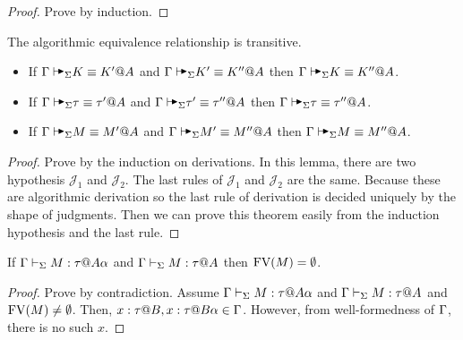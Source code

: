 \begin{proof}
    Prove by induction.
\end{proof}

\begin{lemma}
    The algorithmic equivalence relationship is transitive.
    \label{lemma:TransitioninAlgorithmicEquivalence}
    \begin{itemize}
        \item If \( \G \AVS K \E K' @ A \) and \( \G \AVS K' \E K'' @ A \) then \( \G \AVS K \E K'' @ A \).
        \item If \( \G \AVS \tau \E \tau' @ A \) and \( \G \AVS \tau' \E \tau'' @ A \) then \( \G \AVS \tau \E \tau'' @ A \).
        \item If \( \G \AVS M \E M' @ A \) and \( \G \AVS M' \E M'' @ A \) then \( \G \AVS M \E M'' @ A \).
    \end{itemize}
\end{lemma}

\begin{proof}
    Prove by the induction on derivations.  In this lemma, there are two
    hypothesis \( \mathcal{J}_1 \) and \( \mathcal{J}_2 \).  The last rules of
    \( \mathcal{J}_1 \) and \( \mathcal{J}_2 \) are the same.  Because these
    are algorithmic derivation so the last rule of derivation is decided
    uniquely by the shape of judgments.  Then we can prove this theorem easily
    from the induction hypothesis and the last rule.
\end{proof}

\begin{lemma}
    \label{lemma:FreeVariableandStage}
    If \( \G\V M:\tau@{A\alpha} \) and \( \Gamma\vdash_\Sigma M:\tau @A \) then \( \text{FV}(M) = \emptyset \).
\end{lemma}

\begin{proof}
    Prove by contradiction. Assume \( \G\V M:\tau@{A\alpha} \) and \( \Gamma\vdash_\Sigma
    M:\tau @A \) and \( \text{FV}(M) \neq \emptyset \). Then, \( x : \tau @ B, x:
    \tau @ B\alpha \in \Gamma \). However, from well-formedness of \( \Gamma \), there
    is no such \( x \).
\end{proof}

